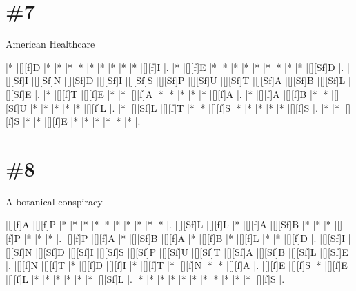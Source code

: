 \documentclass[letterpaper]{article}
\begin{document}
\section*{\#7}
American Healthcare

\vspace*{1em}
\begin{Puzzle}{12}{7}
|*        |[][f]D   |*        |*        |*        |*        |*        |*        |*        |*        |*        |[][f]I   |.
|*        |[][f]E   |*        |*        |*        |*        |*        |*        |*        |*        |*        |[][Sf]D  |.  
|[][Sf]I  |[][Sf]N  |[][Sf]D  |[][Sf]I  |[][Sf]S  |[][Sf]P  |[][Sf]U  |[][Sf]T  |[][Sf]A  |[][Sf]B  |[][Sf]L  |[][Sf]E  |.
|*        |[][f]T   |[][f]E   |*        |*        |[][f]A   |*        |*        |*        |*        |*        |[][f]A   |. 
|*        |[][f]A   |[][f]B   |*        |*        |[][Sf]U  |*        |*        |*        |*        |*        |[][f]L   |.
|*        |[][Sf]L  |[][f]T   |*        |*        |[][f]S   |*        |*        |*        |*        |*        |[][f]S   |.
|*        |*        |[][f]S   |*        |*        |[][f]E   |*        |*        |*        |*        |*        |*        |.
\end{Puzzle}

\section*{\#8}
A botanical conspiracy

\vspace*{1em}
\begin{Puzzle}{12}{7}
|[][f]A   |[][f]P   |*        |*        |*        |*        |*        |*        |*        |*        |*        |*        |.  
|[][Sf]L  |[][f]L   |*        |[][f]A   |[][Sf]B  |*        |*        |*        |[][f]P   |*        |*        |*        |.
|[][f]P   |[][f]A   |*        |[][Sf]B  |[][f]A   |*        |[][f]B   |*        |[][f]L   |*        |*        |[][f]D   |.  
|[][Sf]I  |[][Sf]N  |[][Sf]D  |[][Sf]I  |[][Sf]S  |[][Sf]P  |[][Sf]U  |[][Sf]T  |[][Sf]A  |[][Sf]B  |[][Sf]L  |[][Sf]E  |.
|[][f]N   |[][f]T   |*        |[][f]D   |[][f]I   |*        |[][f]T   |*        |[][f]N   |*        |*        |[][f]A   |. 
|[][f]E   |[][f]S   |*        |[][f]E   |[][f]L   |*        |*        |*        |*        |*        |*        |[][Sf]L  |.
|*        |*        |*        |*        |*        |*        |*        |*        |*        |*        |*        |[][f]S   |.
\end{Puzzle}
\end{document}
